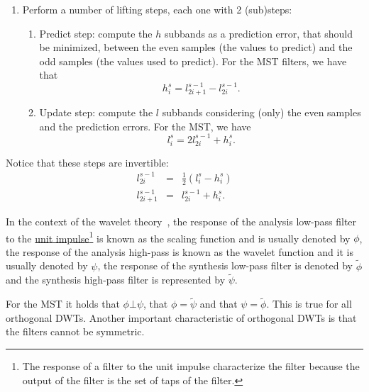 \begin{enumerate}
\item Perform a number of lifting steps, each one with 2 (sub)steps:
  \begin{enumerate}
  \item Predict step: compute the $h$ subbands as a prediction error,
    that should be minimized, between the even samples (the values to
    predict) and the odd samples (the values used to predict). For the
    MST filters, we have that
    \begin{equation}
      h^s_i = l^{s-1}_{2i+1} - l^{s-1}_{2i}.
    \end{equation}
    
  \item Update step: compute the $l$ subbands considering (only) the even
    samples and the prediction errors. For the MST, we have
    \begin{equation}
      l^s_i = 2l^{s-1}_{2i} + h^s_i.
    \end{equation}
  \end{enumerate}
\end{enumerate}

Notice that these steps are invertible:
\begin{equation}
  \begin{array}{rcl}
    l^{s-1}_{2i} & = & \frac{1}{2}(l^s_i - h^s_i)\\
    l^{s-1}_{2i+1} & = & l^{s-1}_{2i} + h^s_i.
  \end{array}
\end{equation}

In the context of the wavelet theory~\cite{burrus2013wavelets}, the
response of the analysis low-pass filter to the
\href{https://en.wikipedia.org/?title=Unit_impulse&redirect=no}{unit
  impulse}\footnote{The response of a filter to the unit impulse
  characterize the filter because the output of the filter is the set
  of taps of the filter.} is known as the scaling function and is
usually denoted by $\phi$, the response of the analysis high-pass is
known as the wavelet function and it is usually denoted by $\psi$, the
response of the synthesis low-pass filter is denoted by $\tilde\phi$
and the synthesis high-pass filter is represented by $\tilde\psi$.

For the MST it holds that $\phi\bot\psi$, that $\phi=\tilde\psi$ and
that $\psi=\tilde\phi$. This is true for all orthogonal DWTs. Another
important characteristic of orthogonal DWTs is that the filters cannot
be symmetric.


